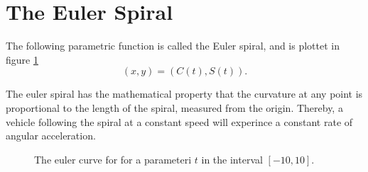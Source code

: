 \documentclass[twocolumn]{article}
\begin{document}
\section{The Euler Spiral}
The following parametric function is called the Euler spiral, and is plottet in figure \ref{fig:eulerSpiral}
\begin{equation}
(x, y) = (C(t), S(t)).
\end{equation}

The euler spiral has the mathematical property that the curvature at any point is proportional to the length of the spiral, measured from the origin. Thereby, a vehicle following the spiral at a constant speed will experince a constant rate of angular acceleration.

\begin{figure}
\centering

\caption{The euler curve for for a parameteri $t$ in the interval $[-10, 10]$.\label{fig:eulerSpiral}}
\end{figure}

{}

\end{document}
